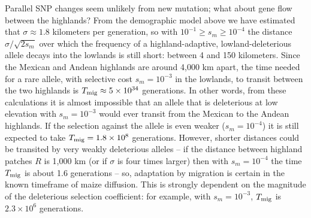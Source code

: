 {{%

Parallel SNP changes seem unlikely from new mutation; 
what about gene flow between the highlands?
From the demographic model above
we have estimated that $\sigma \approx 1.8$ kilometers per generation,
so with $10^{-1} \ge s_m \ge 10^{-4}$ the distance $\sigma/\sqrt{2s_m}$ over which the frequency of 
a highland-adaptive, lowland-deleterious allele decays into the lowlands
is still short: between 4 and 150 kilometers.
Since the Mexican and Andean highlands are around 4,000 km apart,
the time needed for a rare allele, with selective cost $s_m=10^{-3}$ in the lowlands, to transit between the two highlands
is $T_{\text{mig}} \approx 5 \times 10^{34}$ generations.
In other words, from these calculations it is almost impossible that an allele that is deleterious at low elevation with $s_m=10^{-3}$ 
would ever transit from the Mexican to the Andean highlands.
If the selection against the allele is even weaker ($s_m=10^{-4}$) it is still expected to take $T_{\text{mig}} = 1.8 \times 10^8$ generations.
However, shorter distances could be transited by very weakly deleterious alleles --
if the distance between highland patches $R$ is 1,000 km (or if $\sigma$ is four times larger)
then with $s_m=10^{-4}$ the time $T_{\text{mig}}$ is about 1.6 generations --
so, adaptation by migration is certain in the known timeframe of maize diffusion.
This is strongly dependent on the magnitude of the deleterious selection coefficient: for example,
with $s_m=10^{-3}$, $T_{\text{mig}}$ is $2.3 \times 10^6$ generations.

}}
